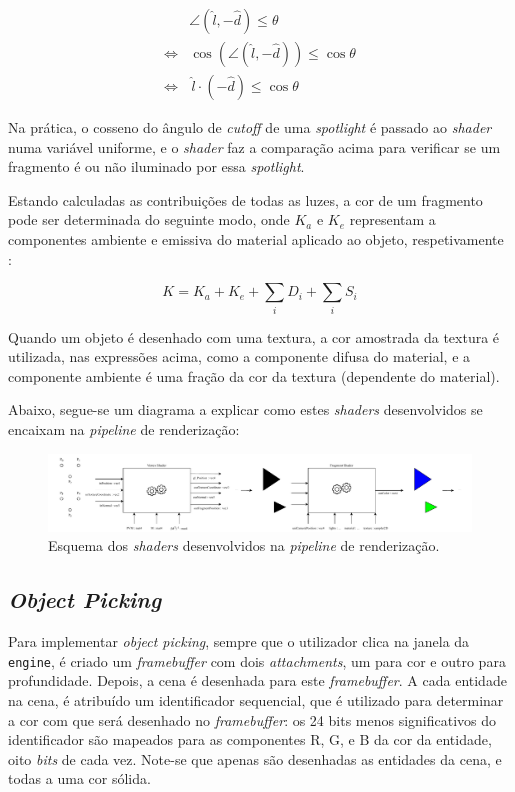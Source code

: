 \documentclass[12pt, a4paper]{article}
\begin{document}
\begin{align*}
    & \angle (\hat{l}, -\hat{d}) \le \theta \\
    \Leftrightarrow & \cos \left ( \angle (\hat{l}, -\hat{d}) \right ) \le \cos \theta \\
    \Leftrightarrow & \, \hat{l} \cdot (-\hat{d}) \le \cos \theta
\end{align*}

Na prática, o cosseno do ângulo de \emph{cutoff} de uma \emph{spotlight} é passado ao \emph{shader}
numa variável uniforme, e o \emph{shader} faz a comparação acima para verificar se um fragmento é
ou não iluminado por essa \emph{spotlight}.

Estando calculadas as contribuições de todas as luzes, a cor de um fragmento pode ser determinada do
seguinte modo, onde $K_a$ e $K_e$ representam a componentes ambiente e emissiva do material aplicado
ao objeto, respetivamente \cite{learn-opengl-1} \cite{learn-opengl-3}:

$$
K = K_a + K_e + \sum_{i} D_i + \sum_{i} S_i
$$

Quando um objeto é desenhado com uma textura, a cor amostrada da textura é utilizada, nas
expressões acima, como a componente difusa do material, e a componente ambiente é uma fração da cor
da textura (dependente do material).

Abaixo, segue-se um diagrama a explicar como estes \emph{shaders} desenvolvidos se encaixam na
\emph{pipeline} de renderização:

\begin{figure}[H]
    \centering
    \includegraphics[width=\textwidth]{res/phase4/Shaders.pdf}
    \caption{Esquema dos \emph{shaders} desenvolvidos na \emph{pipeline} de renderização.}
\end{figure}

\subsection{\emph{Object Picking}}

Para implementar \emph{object picking}, sempre que o utilizador clica na janela da \texttt{engine},
é criado um \emph{framebuffer} com dois \emph{attachments}, um para cor e outro para profundidade.
Depois, a cena é desenhada para este \emph{framebuffer}. A cada entidade na cena, é atribuído um
identificador sequencial, que é utilizado para determinar a cor com que será desenhado no
\emph{framebuffer}: os 24 bits menos significativos do identificador são mapeados para as
componentes R, G, e B da cor da entidade, oito \emph{bits} de cada vez. Note-se que apenas são
desenhadas as entidades da cena, e todas a uma cor sólida.
\end{document}
